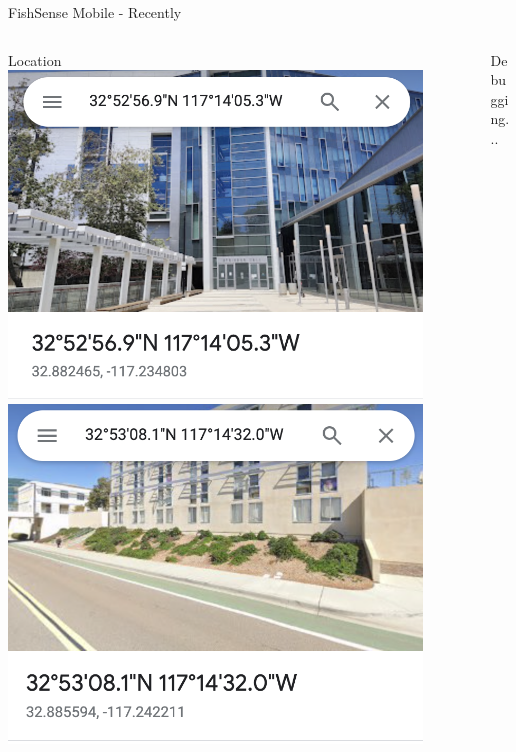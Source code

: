 \begin{frame}{FishSense Mobile - Recently}
    \begin{columns}
        \begin{column}{0.3\textwidth}
            Location
            \centering
            \includegraphics[height=0.9\textheight,width=0.9\textwidth,keepaspectratio]{images/DB_ID15.png}
            \centering
            \includegraphics[height=0.9\textheight,width=0.9\textwidth,keepaspectratio]{images/DB_ID16.png}
        \end{column}
        \begin{column}{0.3\textwidth}
            Debugging...
            \centering

\end{column}
\end{columns}
\end{frame}
